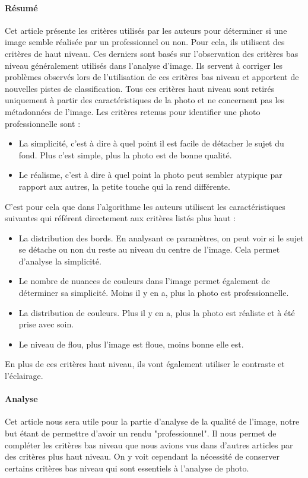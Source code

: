 \documentclass[11pt, french,screen]{report-rd-info}
\begin{document}
\paragraph{Résumé}
Cet article présente les critères utilisés par les auteurs pour déterminer si une image semble réalisée par un professionnel ou non. Pour cela, ils utilisent des critères de haut niveau. Ces derniers sont basés sur l'observation des critères bas niveau généralement utilisés dans l'analyse d'image. Ils servent à corriger les problèmes observés lors de l'utilisation de ces critères bas niveau et apportent de nouvelles pistes de classification.
Tous ces critères haut niveau sont retirés uniquement à partir des caractéristiques de la photo et ne concernent pas les métadonnées de l'image.
Les critères retenus pour identifier une photo professionnelle sont :
\begin{itemize}
\item La simplicité, c'est à dire à quel point il est facile de détacher le sujet du fond. Plus c'est simple, plus la photo est de bonne qualité.
\item Le réalisme, c'est à dire à quel point la photo peut sembler atypique par rapport aux autres, la petite touche qui la rend différente.
\end{itemize}
C'est pour cela que dans l'algorithme les auteurs utilisent les caractéristiques suivantes qui référent directement aux critères listés plus haut :
\begin{itemize}
\item La distribution des bords. En analysant ce paramètres, on peut voir si le sujet se détache ou non du reste au niveau du centre de l'image. Cela permet d'analyse la simplicité.
\item Le nombre de nuances de couleurs dans l'image permet également de déterminer sa simplicité. Moins il y en a, plus la photo est professionnelle.
\item La distribution de couleurs. Plus il y en a, plus la photo est réaliste et à été prise avec soin.
\item Le niveau de flou, plus l'image est floue, moins bonne elle est.
\end{itemize}
En plus de ces critères haut niveau, ils vont également utiliser le contraste et l'éclairage.
\paragraph{Analyse}
Cet article nous sera utile pour la partie d'analyse de la qualité de l'image, notre but étant de permettre d'avoir un rendu "professionnel". Il nous permet de compléter les critères bas niveau que nous avions vus dans d'autres articles par des critères plus haut niveau. On y voit cependant la nécessité de conserver certains critères bas niveau qui sont essentiels à l'analyse de photo.
\end{document}
